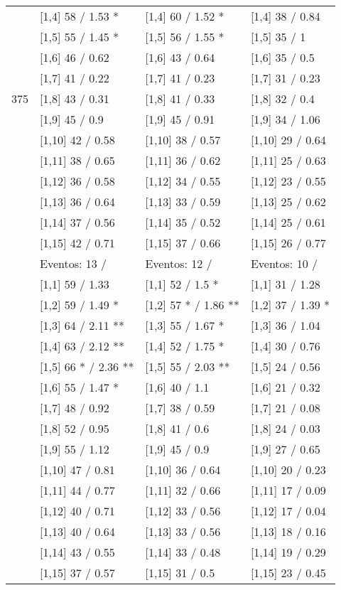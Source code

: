\begin{table}
\begin{tabular}[t]{llll}
 & {}[1,4] 58  / 1.53 * & {}[1,4] 60  / 1.52 * & {}[1,4] 38  / 0.84\\
 & {}[1,5] 55  / 1.45 * & {}[1,5] 56  / 1.55 * & {}[1,5] 35  / 1\\
 & {}[1,6] 46  / 0.62 & {}[1,6] 43  / 0.64 & {}[1,6] 35  / 0.5\\
 & {}[1,7] 41  / 0.22 & {}[1,7] 41  / 0.23 & {}[1,7] 31  / 0.23\\
375 & {}[1,8] 43  / 0.31 & {}[1,8] 41  / 0.33 & {}[1,8] 32  / 0.4\\
\addlinespace
 & {}[1,9] 45  / 0.9 & {}[1,9] 45  / 0.91 & {}[1,9] 34  / 1.06\\
 & {}[1,10] 42  / 0.58 & {}[1,10] 38  / 0.57 & {}[1,10] 29  / 0.64\\
 & {}[1,11] 38  / 0.65 & {}[1,11] 36  / 0.62 & {}[1,11] 25  / 0.63\\
 & {}[1,12] 36  / 0.58 & {}[1,12] 34  / 0.55 & {}[1,12] 23  / 0.55\\
 & {}[1,13] 36  / 0.64 & {}[1,13] 33  / 0.59 & {}[1,13] 25  / 0.62\\
\addlinespace
 & {}[1,14] 37  / 0.56 & {}[1,14] 35  / 0.52 & {}[1,14] 25  / 0.61\\
 & {}[1,15] 42  / 0.71 & {}[1,15] 37  / 0.66 & {}[1,15] 26  / 0.77\\
 & Eventos:  13 / & Eventos:  12 / & Eventos:  10 /\\
 & {}[1,1] 59  / 1.33 & {}[1,1] 52  / 1.5 * & {}[1,1] 31  / 1.28\\
 & {}[1,2] 59  / 1.49 * & {}[1,2] 57 * / 1.86 ** & {}[1,2] 37  / 1.39 *\\
\addlinespace
 & {}[1,3] 64  / 2.11 ** & {}[1,3] 55  / 1.67 * & {}[1,3] 36  / 1.04\\
 & {}[1,4] 63  / 2.12 ** & {}[1,4] 52  / 1.75 * & {}[1,4] 30  / 0.76\\
 & {}[1,5] 66 * / 2.36 ** & {}[1,5] 55  / 2.03 ** & {}[1,5] 24  / 0.56\\
 & {}[1,6] 55  / 1.47 * & {}[1,6] 40  / 1.1 & {}[1,6] 21  / 0.32\\
 & {}[1,7] 48  / 0.92 & {}[1,7] 38  / 0.59 & {}[1,7] 21  / 0.08\\
\addlinespace
500 & {}[1,8] 52  / 0.95 & {}[1,8] 41  / 0.6 & {}[1,8] 24  / 0.03\\
 & {}[1,9] 55  / 1.12 & {}[1,9] 45  / 0.9 & {}[1,9] 27  / 0.65\\
 & {}[1,10] 47  / 0.81 & {}[1,10] 36  / 0.64 & {}[1,10] 20  / 0.23\\
 & {}[1,11] 44  / 0.77 & {}[1,11] 32  / 0.66 & {}[1,11] 17  / 0.09\\
 & {}[1,12] 40  / 0.71 & {}[1,12] 33  / 0.56 & {}[1,12] 17  / 0.04\\
\addlinespace
 & {}[1,13] 40  / 0.64 & {}[1,13] 33  / 0.56 & {}[1,13] 18  / 0.16\\
 & {}[1,14] 43  / 0.55 & {}[1,14] 33  / 0.48 & {}[1,14] 19  / 0.29\\
 & {}[1,15] 37  / 0.57 & {}[1,15] 31  / 0.5 & {}[1,15] 23  / 0.45\\
\bottomrule
\end{tabular}
\end{table}

